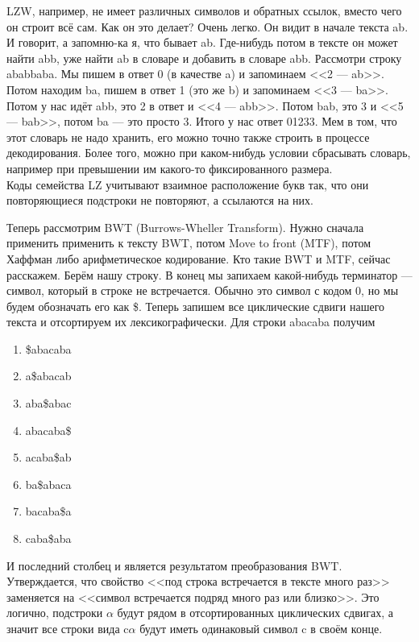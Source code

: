 \documentclass{article}
\begin{document}
\begin{itemize}
\begin{Comment}
            LZW, например, не имеет различных символов и обратных ссылок, вместо чего он строит всё сам. Как он это делает? Очень легко. Он видит в начале текста ab. И говорит, а запомню-ка я, что бывает ab. Где-нибудь потом в тексте он может найти abb, уже найти ab в словаре и добавить в словаре abb. Рассмотри строку ababbaba. Мы пишем в ответ 0 (в качестве a) и запоминаем <<2 --- ab>>. Потом находим ba, пишем в ответ 1 (это же b) и запоминаем <<3 --- ba>>. Потом у нас идёт abb, это 2 в ответ и <<4 --- abb>>. Потом bab, это 3 и <<5 --- bab>>, потом ba --- это просто 3. Итого у нас ответ 01233. Мем в том, что этот словарь не надо хранить, его можно точно также строить в процессе декодирования. Более того, можно при каком-нибудь условии сбрасывать словарь, например при превышении им какого-то фиксированного размера.\\
            Коды семейства LZ учитывают взаимное расположение букв так, что они повторяющиеся подстроки не повторяют, а ссылаются на них.
        \end{Comment}
        \begin{Comment}
            Теперь рассмотрим BWT (Burrows-Wheller Transform). Нужно сначала применить применить к тексту BWT, потом Move to front (MTF), потом Хаффман либо арифметическое кодирование. Кто такие BWT и MTF, сейчас расскажем. Берём нашу строку. В конец мы запихаем какой-нибудь терминатор --- символ, который в строке не встречается. Обычно это символ с кодом 0, но мы будем обозначать его как \$. Теперь запишем все циклические сдвиги нашего текста и отсортируем их лексикографически. Для строки abacaba получим
            \begin{enumerate}[1)]
                \item \$abacaba
                \item a\$abacab
                \item aba\$abac
                \item abacaba\$
                \item acaba\$ab
                \item ba\$abaca
                \item bacaba\$a
                \item caba\$aba
            \end{enumerate}
            И последний столбец и является результатом преобразования BWT. Утверждается, что свойство <<под строка встречается в тексте много раз>> заменяется на <<символ встречается подряд много раз или близко>>. Это логично, подстроки $\alpha$ будут рядом в отсортированных циклических сдвигах, а значит все строки вида c$\alpha$ будут иметь одинаковый символ c в своём конце.\\

\end{Comment}
\end{itemize}
\end{document}
